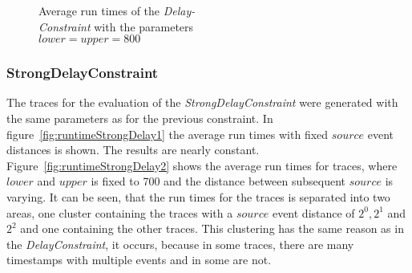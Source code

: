 \begin{figure}
\begin{minipage}{0.45\textwidth}
			\centering
			\caption{Average run times of the \textit{Delay-\\Constraint} with the parameters\\ $lower = upper = 800$}
			\label{fig:runtimeDelay2}
		\end{minipage}
		
	\end{figure}


\subsubsection{StrongDelayConstraint}
	The traces for the evaluation of the \textit{StrongDelayConstraint} were generated with the same parameters as for the previous constraint. In figure~\ref{fig:runtimeStrongDelay1} the average run times with fixed $source$ event distances is shown. The results are nearly constant. Figure~\ref{fig:runtimeStrongDelay2} shows the average run times for traces, where $lower$ and $upper$ is fixed to 700 and the distance between subsequent $source$ is varying. It can be seen, that the run times for the traces is separated into two areas, one cluster containing the traces with a $source$ event distance of $2^0, 2^1$ and $2^2$ and one containing the other traces. This clustering has the same reason as in the \textit{DelayConstraint}, it occurs, because in some traces, there are many timestamps with multiple events and in some are not.
	
